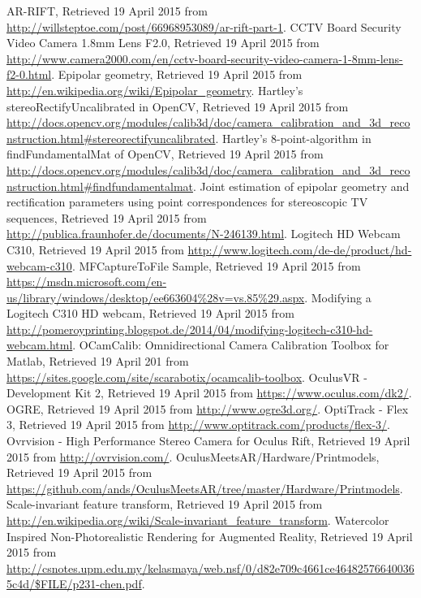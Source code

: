 	\newpage

	\nocite{*}
	\ihead[\leftmark]{\leftmark}
	\begin{thebibliography}{99}

		 AR-RIFT, Retrieved 19 April 2015 from \url{http://willsteptoe.com/post/66968953089/ar-rift-part-1}.
		 CCTV Board Security Video Camera 1.8mm Lens F2.0, Retrieved 19 April 2015 from \url{http://www.camera2000.com/en/cctv-board-security-video-camera-1-8mm-lens-f2-0.html}.
		 Epipolar geometry, Retrieved 19 April 2015 from \url{http://en.wikipedia.org/wiki/Epipolar_geometry}.
		 Hartley's stereoRectifyUncalibrated in OpenCV, Retrieved 19 April 2015 from \url{http://docs.opencv.org/modules/calib3d/doc/camera_calibration_and_3d_reconstruction.html#stereorectifyuncalibrated}.
		 Hartley's 8-point-algorithm in findFundamentalMat of OpenCV, Retrieved 19 April 2015 from \url{http://docs.opencv.org/modules/calib3d/doc/camera_calibration_and_3d_reconstruction.html#findfundamentalmat}.
		 Joint estimation of epipolar geometry and rectification parameters using point correspondences for stereoscopic TV sequences, Retrieved 19 April 2015 from \url{http://publica.fraunhofer.de/documents/N-246139.html}.
		 Logitech HD Webcam C310, Retrieved 19 April 2015 from \url{http://www.logitech.com/de-de/product/hd-webcam-c310}.
		 MFCaptureToFile Sample, Retrieved 19 April 2015 from \url{https://msdn.microsoft.com/en-us/library/windows/desktop/ee663604%28v=vs.85%29.aspx}.
		 Modifying a Logitech C310 HD webcam, Retrieved 19 April 2015 from \url{http://pomeroyprinting.blogspot.de/2014/04/modifying-logitech-c310-hd-webcam.html}.
		 OCamCalib: Omnidirectional Camera Calibration Toolbox for Matlab, Retrieved 19 April 201 from \url{https://sites.google.com/site/scarabotix/ocamcalib-toolbox}.
		 OculusVR - Development Kit 2, Retrieved 19 April 2015 from \url{https://www.oculus.com/dk2/}.
		 OGRE, Retrieved 19 April 2015 from \url{http://www.ogre3d.org/}.
		 OptiTrack - Flex 3, Retrieved 19 April 2015 from \url{http://www.optitrack.com/products/flex-3/}.
		 Ovrvision - High Performance Stereo Camera for Oculus Rift, Retrieved 19 April 2015 from \url{http://ovrvision.com/}.
		 OculusMeetsAR/Hardware/Printmodels, Retrieved 19 April 2015 from \url{https://github.com/ands/OculusMeetsAR/tree/master/Hardware/Printmodels}.
		 Scale-invariant feature transform, Retrieved 19 April 2015 from \url{http://en.wikipedia.org/wiki/Scale-invariant_feature_transform}.
		 Watercolor Inspired Non-Photorealistic Rendering for Augmented Reality, Retrieved 19 April 2015 from \url{http://csnotes.upm.edu.my/kelasmaya/web.nsf/0/d82e709c4661ce464825766400365c4d/$FILE/p231-chen.pdf}.

	\end{thebibliography}


